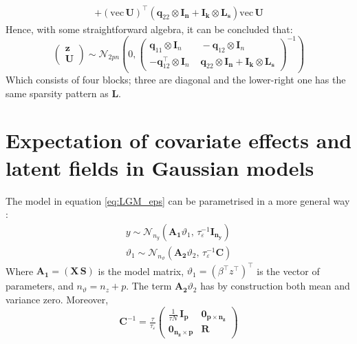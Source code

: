 \documentclass[openany, 11pt, oneside]{book}
\begin{document}
\begin{subappendices}
\begin{align*}
%
+  (\mathrm{vec}\,\boldsymbol{U})^{\top}
    \left(\boldsymbol{q}_{22} \otimes \boldsymbol{I_n} + \boldsymbol{I_k}\otimes \boldsymbol{L_s}\right)
   \mathrm{vec}\,\boldsymbol{U}
\end{align*}
Hence, with some straightforward algebra, it can be concluded that:
\begin{equation} \label{eq:joint_bym_mmod}
    \begin{pmatrix}
         \boldsymbol{z} \\ \boldsymbol{U} 
    \end{pmatrix}
    \sim \mathcal{N}_{2pn} \left( 0, \begin{pmatrix} 
            \boldsymbol{q}_{11} \otimes \boldsymbol{I}_n \, & 
            \, - \boldsymbol{q}_{12} \otimes \boldsymbol{I}_n \\
            - \boldsymbol{q}_{12}^\top\otimes \boldsymbol{I}_n \, & \,
             \boldsymbol{q}_{22} \otimes \boldsymbol{I_n} + \boldsymbol{I_k} \otimes \boldsymbol{L_s}
        \end{pmatrix}^{-1} \right)
\end{equation}
Which consists of four blocks; three are diagonal and the lower-right one has the same sparsity pattern as $\boldsymbol{L}$.

 
\section{Expectation of covariate effects and latent fields in Gaussian models} \label{appendix:LGM}

The model in equation \ref{eq:LGM_eps} can be parametrised in a more general way \parencite[see e.g.][]{DIC}:
%
\begin{equation}
\begin{aligned}
y \sim \mathcal{N}_{n_y}
\left(\boldsymbol{A_1} \vartheta_1, \,
\tau_{\varepsilon}^{-1} \boldsymbol{I_{n_y}} \right) \\
\vartheta_1 \sim \mathcal{N}_{n_\vartheta} \left(\boldsymbol{A_2 } \vartheta_2,\,
\tau_{\varepsilon}^{-1} \boldsymbol{C}\right)
\end{aligned}
\label{eq:LGM_y_theta}
\end{equation}
%
Where  $\boldsymbol{A_1} = \left(\boldsymbol{X} \, \boldsymbol{S} \right)$ is the model matrix, $\vartheta_1 = (\beta^{\top} z^{\top})^{\top}$ is the vector of parameters, and $n_\vartheta = n_z + p$. The term $\boldsymbol{A_2} \vartheta_2$ has by construction both mean and variance zero. Moreover,
$$ 
\boldsymbol{C}^{-1} = \tfrac{\tau}{\tau_{\varepsilon}} \begin{pmatrix}
 \frac{1}{\tau N} \, \boldsymbol{I_p} & \boldsymbol{0_{p \times n_z}} \\
 \boldsymbol{0_{n_z \times p}} & \boldsymbol{R}
\end{pmatrix}
$$


\end{subappendices}
\end{document}
